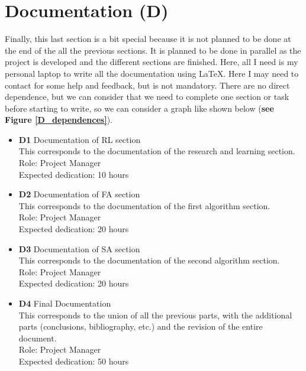 \section{Documentation \textbf{(D)}}
Finally, this last section is a bit special because it is not planned to be done at the end of the all the previous sections.
It is planned to be done in parallel as the project is developed and the different sections are finished.
Here, all I need is my personal laptop to write all the documentation using \LaTeX.
Here I may need to contact for some help and feedback, but is not mandatory.
There are no direct dependence, but we can consider that we need to complete one section or task before starting to write, so we can consider a graph like shown below (\textbf{see Figure \ref{D_dependences}}).
\begin{itemize}
    \item \textbf{D1} Documentation of RL section \\
        This corresponds to the documentation of the research and learning section. \\
        Role: Project Manager \\
        Expected dedication: 10 hours
    \item \textbf{D2} Documentation of FA section\\
        This corresponds to the documentation of the first algorithm section. \\
        Role: Project Manager \\
        Expected dedication: 20 hours
    \item \textbf{D3} Documentation of SA section \\
        This corresponds to the documentation of the second algorithm section. \\
        Role: Project Manager \\
        Expected dedication: 20 hours
    \item \textbf{D4} Final Documentation \\
    This corresponds to the union of all the previous parts, with the additional parts (conclusions, bibliography, etc.) and the revision of the entire document. \\
    Role: Project Manager \\
    Expected dedication: 50 hours        
\end{itemize}
